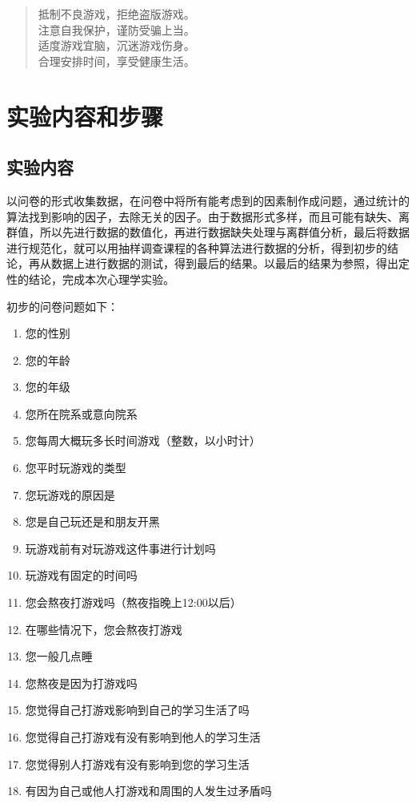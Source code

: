 \documentclass{zjureport}
\begin{document}
  \begin{quote}
    抵制不良游戏，拒绝盗版游戏。\\
    注意自我保护，谨防受骗上当。\\
    适度游戏宜脑，沉迷游戏伤身。\\
    合理安排时间，享受健康生活。
  \end{quote}


\section{实验内容和步骤}
  \subsection{实验内容}
    以问卷的形式收集数据，在问卷中将所有能考虑到的因素制作成问题，通过统计的算法找到影响的因子，去除无关的因子。由于数据形式多样，而且可能有缺失、离群值，所以先进行数据的数值化，再进行数据缺失处理与离群值分析，最后将数据进行规范化，就可以用抽样调查课程的各种算法进行数据的分析，得到初步的结论，再从数据上进行数据的测试，得到最后的结果。以最后的结果为参照，得出定性的结论，完成本次心理学实验。
    
    初步的问卷问题如下：

    \begin{multicols}{2}
        \begin{enumerate}
          \item 您的性别
          \item 您的年龄
          \item 您的年级
          \item 您所在院系或意向院系
          \item 您每周大概玩多长时间游戏（整数，以小时计）
          \item 您平时玩游戏的类型
          \item 您玩游戏的原因是
          \item 您是自己玩还是和朋友开黑
          \item 玩游戏前有对玩游戏这件事进行计划吗
          \item 玩游戏有固定的时间吗
          \item 您会熬夜打游戏吗（熬夜指晚上12:00以后）
          \item 在哪些情况下，您会熬夜打游戏
          \item 您一般几点睡
          \item 您熬夜是因为打游戏吗
          \item 您觉得自己打游戏影响到自己的学习生活了吗
          \item 您觉得自己打游戏有没有影响到他人的学习生活
          \item 您觉得别人打游戏有没有影响到您的学习生活
          \item 有因为自己或他人打游戏和周围的人发生过矛盾吗
        \end{enumerate}
    \end{multicols}
\end{document}

